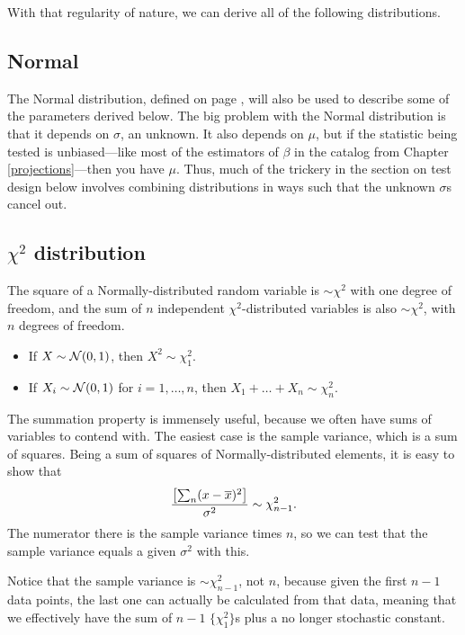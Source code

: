 With that regularity of nature, we can derive all of the following
distributions.  \label{CLT}

\subsection{Normal} 

The Normal distribution, defined on page \pageref{normal},
will also be used to describe some of the parameters derived below.
The big problem with the Normal distribution is that it depends on $\sigma$, an
unknown. It also depends on $\mu$, but if the statistic
being tested is unbiased---like most of the estimators of $\beta$ in the
catalog from Chapter \ref{projections}---then you have $\mu$. Thus, much of the trickery in the
section on test design below involves combining distributions in ways
such that the unknown $\sigma$s cancel out.

\subsection{$\chi^2$ distribution} 
The square of a Normally-distributed random variable is $\sim \chi^2$
with one degree of freedom, and the sum of $n$ independent
$\chi^2$-distributed variables is also $\sim \chi^2$, with $n$ degrees
of freedom.

\begin{itemize}
\item If $X \sim {\cal N} (0,1)$, then $X^2 \sim \chi^2_1$.

\item If $X_i \sim {\cal N} (0,1)$ for $i=1, \dots, n$, then
$ X_1 + \dots + X_n \sim \chi^2_n$.
\end{itemize}			\label{chisq}

The summation property is immensely useful, because we often have sums
of variables to contend with. The easiest case is the sample variance,
which is a sum of squares. Being a sum of squares of Normally-distributed
elements, it is easy to show that 
\begin{equation}\label{chisqvar}  
{\left[\sum_n (x-\overline x)^2\right]\over \sigma^2}\sim \chi^2_{n-1}.
\end{equation}
The numerator there is the sample variance times $n$, so
we can test that the sample variance equals a given $\sigma^2$ with this.

Notice that the sample variance is $\sim
\chi^2_{n-1}$, not $n$, because given the first $n-1$ data points, the
last one can actually be calculated from that data, meaning that we
effectively have the sum of $n-1$ $\{\chi^2_1\}$s plus a no longer
stochastic constant.

